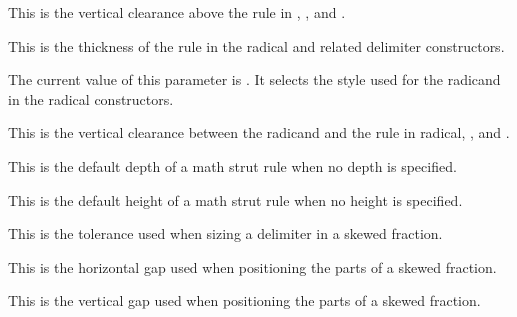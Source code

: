 \stopnewprimitive

\startnewprimitive[title={\prm {Umathradicalkern}}]

This is the vertical clearance above the rule in , ,
 and .

\stopnewprimitive

\startnewprimitive[title={\prm {Umathradicalrule}}]

This is the thickness of the rule in the radical and related delimiter
constructors.

\stopnewprimitive

\startnewprimitive[title={\prm {Umathradicalvariant}}]

The current value of this parameter is \CurrentMathVariant \Umathradicalvariant.
It selects the style used for the radicand in the radical constructors.

\stopnewprimitive

\startnewprimitive[title={\prm {Umathradicalvgap}}]

This is the vertical clearance between the radicand and the rule in \prm
{radical}, ,  and .

\stopnewprimitive

\startnewprimitive[title={\prm {Umathruledepth}}]

This is the default depth of a math strut rule when no depth is specified.

\stopnewprimitive

\startnewprimitive[title={\prm {Umathruleheight}}]

This is the default height of a math strut rule when no height is specified.

\stopnewprimitive

\startnewprimitive[title={\prm {Umathskeweddelimitertolerance}}]

This is the tolerance used when sizing a delimiter in a skewed fraction.

\stopnewprimitive

\startnewprimitive[title={\prm {Umathskewedfractionhgap}}]

This is the horizontal gap used when positioning the parts of a skewed fraction.

\stopnewprimitive

\startnewprimitive[title={\prm {Umathskewedfractionvgap}}]

This is the vertical gap used when positioning the parts of a skewed fraction.

